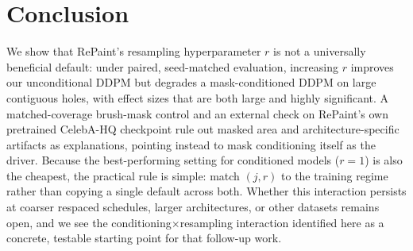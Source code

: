 \section{Conclusion}
\label{sec:conclusion}

We show that RePaint's resampling hyperparameter $r$ is not a universally beneficial default: under paired, seed-matched evaluation, increasing $r$ improves our unconditional DDPM but degrades a mask-conditioned DDPM on large contiguous holes, with effect sizes that are both large and highly significant.
A matched-coverage brush-mask control and an external check on RePaint's own pretrained CelebA-HQ checkpoint rule out masked area and architecture-specific artifacts as explanations, pointing instead to mask conditioning itself as the driver.
Because the best-performing setting for conditioned models ($r{=}1$) is also the cheapest, the practical rule is simple: match $(j,r)$ to the training regime rather than copying a single default across both.
Whether this interaction persists at coarser respaced schedules, larger architectures, or other datasets remains open, and we see the conditioning$\times$resampling interaction identified here as a concrete, testable starting point for that follow-up work.

